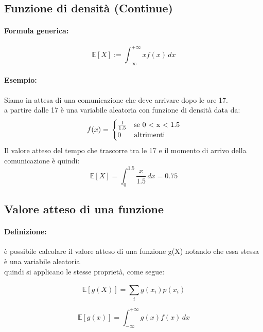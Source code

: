 \documentclass[]{article}
\newcommand{\ev}{\mathbb{E}[X]}
\renewcommand{\ev}[1]{\mathbb{E}[#1]}
\newcommand{\definizione}{\paragraph{Definizione:}}
\newcommand{\formula}{\paragraph{Formula generica:}}
\begin{document}
    
    \subsection{Funzione di densità (Continue)}
    \formula \[ \ev{X} := \int_{-\infty}^{+\infty} x f(x) \, dx \]
    \paragraph{Esempio:} Siamo in attesa di una comunicazione che deve arrivare dopo le ore 17. \\
    a partire dalle 17 è una variabile aleatoria con funzione di densità data da:
    \begin{equation*}
        f(x) = \\
        \begin{cases}
            \frac{1}{1.5} & \text{se 0 < x < 1.5} \\
            0 & \text{altrimenti}
        \end{cases}
    \end{equation*}
    Il valore atteso del tempo che trascorre tra le 17 e il momento di arrivo della comunicazione è quindi:
    \[ \ev{X} = \int_{0}^{1.5} \frac{x}{1.5} \, dx = 0.75\]

    \subsection{Valore atteso di una funzione}
    \definizione è possibile calcolare il valore atteso di una funzione g(X) notando che essa stessa è una variabile aleatoria \\
    quindi si applicano le stesse proprietà, come segue: \\
    \linebreak[4]

    \begin{minipage}{0.45\textwidth}
        \begin{equation*}
            \ev{g(X)} = \sum_{i}^{} g(x_i) p(x_i)
        \end{equation*}
    \end{minipage}
    \hfill
    \begin{minipage}{0.45\textwidth}
        \begin{equation*}
            \ev{g(x)} = \int_{-\infty}^{+\infty} g(x) f(x) \, dx
        \end{equation*}
    \end{minipage}
\end{document}
